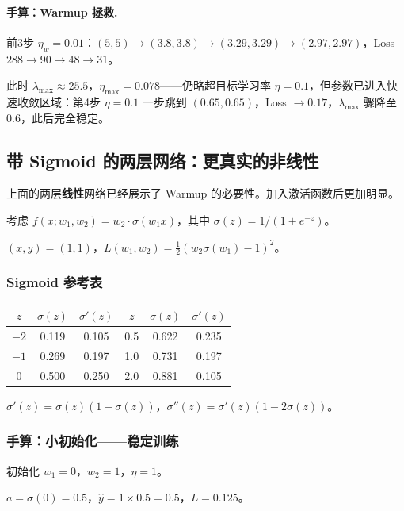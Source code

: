\documentclass[12pt, a4paper]{ctexart}
\begin{document}
\paragraph{手算：Warmup 拯救.} 前3步 $\eta_w=0.01$：$(5,5)\to(3.8,3.8)\to(3.29,3.29)\to(2.97,2.97)$，Loss $288\to 90\to 48\to 31$。

此时 $\lambda_{\max}\approx 25.5$，$\eta_{\max}=0.078$——仍略超目标学习率 $\eta=0.1$，但参数已进入快速收敛区域：第4步 $\eta=0.1$ 一步跳到 $(0.65,0.65)$，Loss $\to 0.17$，$\lambda_{\max}$ 骤降至 $0.6$，此后完全稳定。

\subsection{带 Sigmoid 的两层网络：更真实的非线性}

上面的两层\textbf{线性}网络已经展示了 Warmup 的必要性。加入激活函数后更加明显。

考虑 $f(x; w_1, w_2) = w_2 \cdot \sigma(w_1 x)$，其中 $\sigma(z) = 1/(1+e^{-z})$。

$(x,y) = (1,1)$，$L(w_1,w_2) = \frac{1}{2}(w_2\sigma(w_1) - 1)^2$。

\subsubsection{Sigmoid 参考表}

\begin{center}
\begin{tabular}{c|cc||c|cc}
$z$ & $\sigma(z)$ & $\sigma'(z)$ & $z$ & $\sigma(z)$ & $\sigma'(z)$ \\
\hline
$-2$ & 0.119 & 0.105 & 0.5 & 0.622 & 0.235 \\
$-1$ & 0.269 & 0.197 & 1.0 & 0.731 & 0.197 \\
$0$ & 0.500 & 0.250 & 2.0 & 0.881 & 0.105 \\
\end{tabular}
\end{center}

$\sigma'(z) = \sigma(z)(1-\sigma(z))$，$\sigma''(z) = \sigma'(z)(1-2\sigma(z))$。

\subsubsection{手算：小初始化——稳定训练}

初始化 $w_1 = 0$，$w_2 = 1$，$\eta = 1$。

$a = \sigma(0) = 0.5$，$\hat{y} = 1 \times 0.5 = 0.5$，$L = 0.125$。
\end{document}
